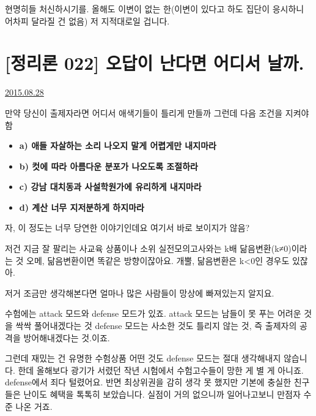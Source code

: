 현명히들 처신하시기를. 올해도 이변이 없는 한(이변이 있다고 하도 집단이 응시하니 어차피 달라질 건 없음) 저 지적대로일 겁니다.
\vspace{5mm}






\section{[정리론 022] 오답이 난다면 어디서 날까.}
\href{https://www.kockoc.com/Apoc/277121}{2015.08.28}

\vspace{5mm}

만약 당신이 출제자라면 어디서 애색기들이 틀리게 만들까
그런데 다음 조건을 지켜야 함
\vspace{5mm}

\begin{itemize}
    \item \textbf{a) 애들 자살하는 소리 나오지 말게 어렵게만 내지마라}
    \item \textbf{b) 컷에 따라 아름다운 분포가 나오도록 조절하라}
    \item \textbf{c) 강남 대치동과 사설학원가에 유리하게 내지마라}
    \item \textbf{d) 계산 너무 지저분하게 하지마라}
\end{itemize}


\vspace{5mm}

자, 이 정도는 너무 당연한 이야기인데요
여기서 바로 보이지가 않음?
\vspace{5mm}

저건 지금 잘 팔리는 사교육 상품이나 소위 실전모의고사와는 k배 닮음변환(k≠0)이라는 것
오메, 닮음변환이면 똑같은 방향이잖아요.
개뿔, 닮음변환은 k<0인 경우도 있잖아.
\vspace{5mm}

저거 조금만 생각해본다면 얼마나 많은 사람들이 망상에 빠져있는지 알지요.
\vspace{5mm}

수험에는 attack 모드와 defense 모드가 있죠.
attack 모드는 남들이 못 푸는 어려운 것을 싹싹 풀어내겠다는 것
defense 모드는 사소한 것도 틀리지 않는 것, 즉 출제자의 공격을 방어해내겠다는 것.이죠.
\vspace{5mm}

그런데 재밌는 건 유명한 수험상품 어떤 것도 defense 모드는 절대 생각해내지 않습니다.
한데 올해보다 광기가 서렸던 작년 시험에서 수험고수들이 망한 게 별 게 아니죠. defense에서 죄다 털렸어요.
반면 최상위권을 감히 생각 못 했지만 기본에 충실한 친구들은 난이도 혜택을 톡톡히 보았습니다.
실점이 거의 없으니까 일어나고보니 만점자 수준 나온 거죠.
\vspace{5mm}

